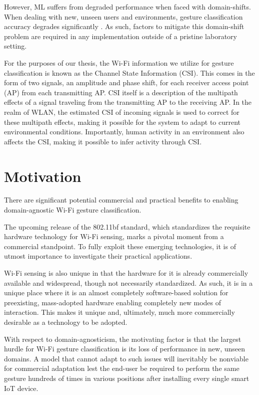 However, ML suffers from degraded performance when faced with domain-shifts.
When dealing with new, unseen users and environments, gesture classification accuracy degrades significantly \cite{chetty2011through,adib2013see,pu2013whole,adib20143d,he2015wig,jiang2018towards,zheng2019zero,jiang2020wigan,ma2021location}.
As such, factors to mitigate this domain-shift problem are required in any implementation outside of a pristine laboratory setting.

For the purposes of our thesis, the Wi-Fi information we utilize for gesture classification is known as the Channel State Information (CSI).
This comes in the form of two signals, an amplitude and phase shift, for each receiver access point (AP) from each transmitting AP.
CSI itself is a description of the multipath effects of a signal traveling from the transmitting AP to the receiving AP.
In the realm of WLAN, the estimated CSI of incoming signals is used to correct for these multipath effects, making it possible for the system to adapt to current environmental conditions.
Importantly, human activity in an environment also affects the CSI, making it possible to infer activity through CSI.

\section{Motivation}\label{sec:intro-motivation}

There are significant potential commercial and practical benefits to enabling domain-agnostic Wi-Fi gesture classification.

The upcoming release of the 802.11bf standard, which standardizes the requisite hardware technology for Wi-Fi sensing, marks a pivotal moment from a commercial standpoint. To fully exploit these emerging technologies, it is of utmost importance to investigate their practical applications.

Wi-Fi sensing is also unique in that the hardware for it is already commercially available and widespread, though not necessarily standardized.
As such, it is in a unique place where it is an almost completely software-based solution for preexisting, mass-adopted hardware enabling completely new modes of interaction.
This makes it unique and, ultimately, much more commercially desirable as a technology to be adopted.

With respect to domain-agnosticism, the motivating factor is that the largest hurdle for Wi-Fi gesture classification is its loss of performance in new, unseen domains.
A model that cannot adapt to such issues will inevitably be nonviable for commercial adaptation lest the end-user be required to perform the same gesture hundreds of times in various positions after installing every single smart IoT device.

